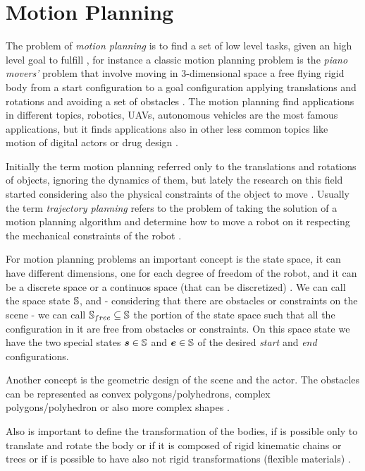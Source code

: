 \documentclass[dissertation.tex]{subfiles}
\begin{document}
\chapter{Motion Planning}
The problem of \emph{motion planning} is to find a set of
low level tasks, given an high level goal to fulfill
\cite{choset}, for instance a classic motion planning problem is the
\emph{piano movers'} problem that involve moving in 3-dimensional space
a free flying rigid 
body from a start configuration to a goal configuration applying
translations and rotations and avoiding a set
of obstacles \cite{choset}\cite{lavalle}. The motion planning find
applications in 
different topics, robotics, \acp{UAV}, autonomous vehicles are the most
famous applications, but it finds applications also in other less
common topics like motion of digital actors or drug design
\cite{choset}.

Initially the term motion planning referred only to the translations
and rotations of objects, ignoring the dynamics of them, but lately
the research on this field started considering also the physical
constraints of the object to move \cite{lavalle}. Usually the term
\emph{trajectory planning} refers to the problem of taking the
solution of a
motion planning algorithm and determine how to move a robot on it
respecting the mechanical constraints of the robot \cite{lavalle}.

For motion planning problems an important concept is the state space,
it can have different dimensions, one for each degree of freedom of
the robot, and it can be a discrete space or a continuos space (that
can be discretized) \cite{lavalle}. We can call the space state $\mathbb{S}$,
and - considering that there are obstacles or constraints on the scene
- we can call $\mathbb{S}_{free}\subseteq\mathbb{S}$
the portion of the state space such that all the configuration in it
are free from obstacles or constraints. On this space state we have
the two special states $\boldsymbol{s}\in\mathbb{S}$ and $\boldsymbol{e}\in\mathbb{S}$ of the
desired \emph{start} and \emph{end} configurations.

Another concept is the geometric design of the scene and the
actor. The obstacles can be represented as convex
polygons/polyhedrons, complex polygons/polyhedron or also more complex
shapes \cite{lavalle}.

Also is important to define the transformation of the bodies, if is
possible only to translate and rotate the body or if it is composed of
rigid kinematic chains or trees or if is possible to have also not
rigid transformations (flexible materials) \cite{lavalle}.
\end{document}
